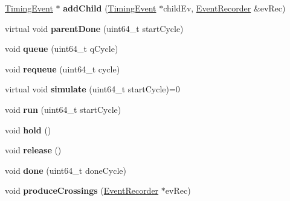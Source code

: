 \begin{DoxyCompactItemize}
\item 
\hypertarget{classTimingEvent_a623c3ec34368c4ad014894e54f1761fb}{\hyperlink{classTimingEvent}{Timing\-Event} $\ast$ {\bfseries add\-Child} (\hyperlink{classTimingEvent}{Timing\-Event} $\ast$child\-Ev, \hyperlink{classEventRecorder}{Event\-Recorder} \&ev\-Rec)}\label{classTimingEvent_a623c3ec34368c4ad014894e54f1761fb}

\item 
\hypertarget{classTimingEvent_a08ba778fc78cffa81f6b93b22889825e}{virtual void {\bfseries parent\-Done} (uint64\-\_\-t start\-Cycle)}\label{classTimingEvent_a08ba778fc78cffa81f6b93b22889825e}

\item 
\hypertarget{classTimingEvent_a1eaa3f3f350fb09b9549c4be1dab5091}{void {\bfseries queue} (uint64\-\_\-t q\-Cycle)}\label{classTimingEvent_a1eaa3f3f350fb09b9549c4be1dab5091}

\item 
\hypertarget{classTimingEvent_a1f737188e07a4f444115f95bf3c1ef7e}{void {\bfseries requeue} (uint64\-\_\-t cycle)}\label{classTimingEvent_a1f737188e07a4f444115f95bf3c1ef7e}

\item 
\hypertarget{classTimingEvent_a99608e7c0c6bbc199fd7ab3cc6707dea}{virtual void {\bfseries simulate} (uint64\-\_\-t start\-Cycle)=0}\label{classTimingEvent_a99608e7c0c6bbc199fd7ab3cc6707dea}

\item 
\hypertarget{classTimingEvent_a78fe421d9a91c70ec249630e3aab8780}{void {\bfseries run} (uint64\-\_\-t start\-Cycle)}\label{classTimingEvent_a78fe421d9a91c70ec249630e3aab8780}

\item 
\hypertarget{classTimingEvent_aa042bb6b4c70456fd81544da49583bbb}{void {\bfseries hold} ()}\label{classTimingEvent_aa042bb6b4c70456fd81544da49583bbb}

\item 
\hypertarget{classTimingEvent_adbbe5607f59f4278462738064fd839f6}{void {\bfseries release} ()}\label{classTimingEvent_adbbe5607f59f4278462738064fd839f6}

\item 
\hypertarget{classTimingEvent_a9e2c0c90bd80d105616121374a7d33e1}{void {\bfseries done} (uint64\-\_\-t done\-Cycle)}\label{classTimingEvent_a9e2c0c90bd80d105616121374a7d33e1}

\item 
\hypertarget{classTimingEvent_a3ec74069d3a97dd192c171a79fef46a4}{void {\bfseries produce\-Crossings} (\hyperlink{classEventRecorder}{Event\-Recorder} $\ast$ev\-Rec)}\label{classTimingEvent_a3ec74069d3a97dd192c171a79fef46a4}


\end{DoxyCompactItemize}
